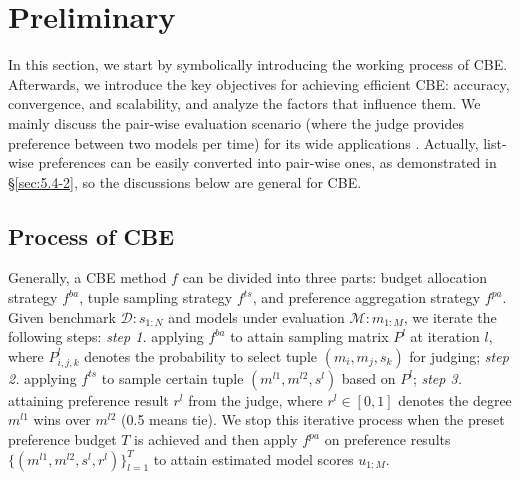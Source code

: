 \section{Preliminary}
\label{sec:3}
In this section, we start by symbolically introducing the working process of CBE. Afterwards, we introduce the key objectives for achieving efficient CBE: accuracy, convergence, and scalability, and analyze the factors that influence them.
We mainly discuss the pair-wise evaluation scenario (where the judge provides preference between two models per time) for its wide applications \citep{paireval,allpair}. Actually, list-wise preferences can be easily converted into pair-wise ones, as demonstrated in \S\ref{sec:5.4-2}, so the discussions below are general for CBE.
\subsection{Process of CBE}
Generally, a CBE method $f$ can be divided into three parts: budget allocation strategy $f^{ba}$, tuple sampling strategy $f^{ts}$, and preference aggregation strategy $f^{pa}$.
Given benchmark $\mathcal{D}:s_{1:N}$ and models under evaluation $\mathcal{M}:m_{1:M}$, we iterate the following steps: 
\textit{step 1.} applying $f^{ba}$ to attain sampling matrix $P^l$ at iteration $l$, where $P_{i,j,k}^l$ denotes the probability to select tuple $(m_i,m_j,s_k)$ for judging; 
\textit{step 2.} applying $f^{ts}$ to sample certain tuple $(m^{l1},m^{l2},s^l)$ based on $P^l$; 
\textit{step 3.} attaining preference result $r^l$ from the judge, where $r^l \in [0,1]$ denotes the degree $m^{l1}$ wins over $m^{l2}$ (0.5 means tie). 
We stop this iterative process when the preset preference budget $T$ is achieved and then apply $f^{pa}$ on preference results $\{(m^{l1},m^{l2},s^l,r^l)\}_{l=1}^T$ to attain estimated model scores $u_{1:M}$.

